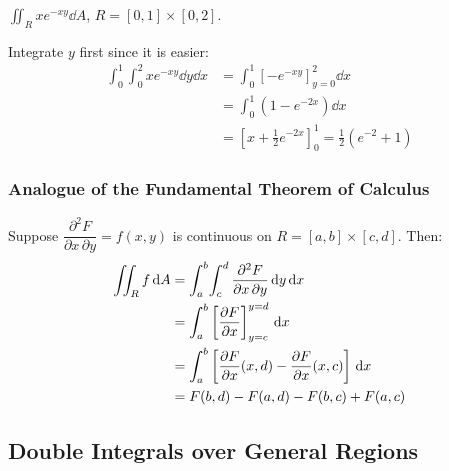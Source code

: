 \begin{example}
  $\displaystyle\iint_R xe^{-xy}\dd{A}$, \; $R=[0,1]\times[0,2]$.

  Integrate $y$ first since it is easier:
  \begin{align*}
    \int_0^1\!\int_0^2 xe^{-xy}\dd{y}\dd{x}
     & = \int_0^1 \left[-e^{-xy}\right]_{y=0}^{2}\dd{x} \\
     & = \int_0^1 \left(1-e^{-2x}\right)\dd{x}          \\
     & = \left[x+\tfrac{1}{2}e^{-2x}\right]_0^1
    = \tfrac{1}{2}(e^{-2}+1)
  \end{align*}
\end{example}

\subsubsection{Analogue of the Fundamental Theorem of Calculus}

Suppose $\dfrac{\partial^{2}F}{\partial x\,\partial y}=f(x,y)$ is continuous on
$R=[a,b]\times[c,d]$. Then:
\begin{align*}
  \iint_R f\,\mathrm{d}A
   & = \int_a^b\!\int_c^d \frac{\partial^{2}F}{\partial x\,\partial y}\,\mathrm{d}y\,\mathrm{d}x \\
   & = \int_a^b \left[\frac{\partial F}{\partial x}\right]_{y=c}^{y=d}\,\mathrm{d}x                           \\
   & = \int_a^b \left[\frac{\partial F}{\partial x}(x,d)-\frac{\partial F}{\partial x}(x,c)\right]\,\mathrm{d}x                   \\
   & = F(b,d) - F(a,d) - F(b,c) + F(a,c)
\end{align*}

\begin{center}
\end{center}

\subsection{Double Integrals over General Regions}

